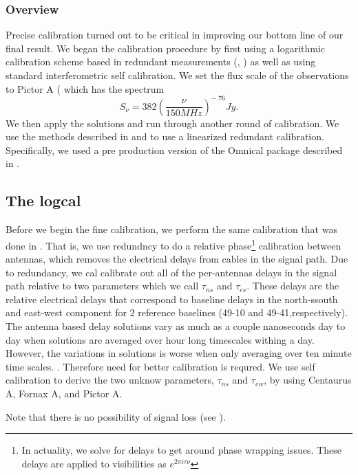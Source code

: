 \documentclass[twocolumn,numberedappendix]{emulateapj}
\begin{document}
\subsubsection{Overview}
Precise calibration turned out to be critical in improving our bottom line of
our final result. We began the calibration procedure by first using a
logarithmic calibration scheme based in redundant measurements
(\citep{liu_et_al2010}, \citep{zheng_et_al2014}) as well as using standard
interferometric self calibration. We set the flux scale of the observations to
Pictor A (\citep{jacobs_et_al_pictor} which has the spectrum 
\begin{equation}
    S_{\nu} = 382(\frac{\nu}{150 MHz})^{-.76} Jy.
\end{equation}
We then apply the solutions and run through another round of calibration. We use
the methods described in \citep{liu_et_al2010} and \citep{zheng_et_al2014} to
use a linearized redundant calibration. Specifically, we used a pre production
version of the Omnical package described in \citep{zhend_et_al2014}.

\subsection{The logcal}
Before we begin the fine calibration, we perform the same calibration that was
done in \citep{parsons2014}. That is, we use redundncy to do a relative
phase\footnote{In actuality, we solve for delays to get around phase wrapping
issues. These delays are applied to visibilities as $e^{2\pi{i}\tau\nu}$}
calibration between antennas, which removes the electrical delays from cables
in the signal path. Due to redundancy, we cal calibrate out all of the
per-antennas delays in the signal path relative to two parameters which we call
$\tau_{ns}$ and $\tau_{es}$. These delays are the relative electrical delays
that correspond to baseline delays in the north-ssouth and east-west component
for 2 reference baselines (49-10 and 49-41,respectively). The antenna based
delay solutions vary as much as a couple nanoseconds day to day when solutions
are averaged over hour long timescales withing a day. However, the variations in
solutions is worse when only averaging over ten minute time scales. . Therefore
need for better calibration is requred.  We use self calibration to derive the
two unknow parameters, $\tau_{ns}$ and $\tau_{ew}$, by using Centaurus A, Fornax
A, and Pictor A.

Note that there is no possibility of signal loss (see \citep{parsons2014}).
\end{document}
